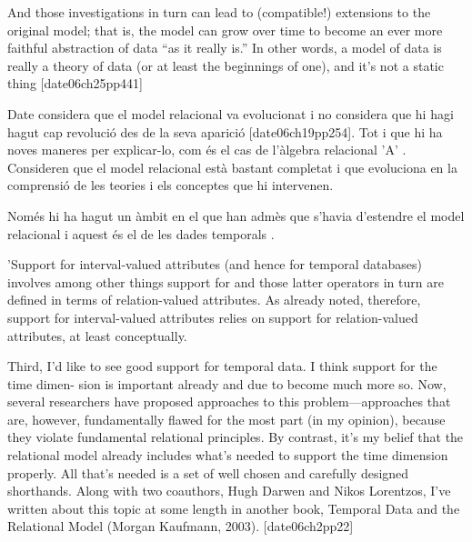                                 And those investigations in turn can lead to (compatible!)
extensions to the original model; that is, the model can grow over time to become an
ever more faithful abstraction of data “as it really is.” In other words, a model of data is
really a theory of data (or at least the beginnings of one), and it’s not a static thing [date06ch25pp441]



Date considera que el model relacional va evolucionat i no considera que hi hagi hagut cap revolució des de la seva aparició [date06ch19pp254]. Tot i que hi ha noves maneres per explicar-lo, com és el cas de l'àlgebra relacional 'A' . Consideren que el model relacional està bastant completat i que evoluciona en la comprensió de les teories i els conceptes que hi intervenen. 

Només hi ha hagut un àmbit en el que han admès que s'havia d'estendre el model relacional i aquest és el de les dades temporals .


  'Support for interval-valued attributes (and hence for temporal databases) involves among other things support for
and those latter operators in turn are defined in terms of relation-valued attributes. As already noted, therefore, support
for interval-valued attributes relies on support for relation-valued attributes, at least conceptually. 

Third, I’d like to see good support for temporal data. I think support for the time dimen-
sion is important already and due to become much more so. Now, several researchers
have proposed approaches to this problem—approaches that are, however, fundamentally
flawed for the most part (in my opinion), because they violate fundamental relational
principles. By contrast, it’s my belief that the relational model already includes what’s
needed to support the time dimension properly. All that’s needed is a set of well chosen
and carefully designed shorthands. Along with two coauthors, Hugh Darwen and Nikos
Lorentzos, I’ve written about this topic at some length in another book, Temporal Data
and the Relational Model (Morgan Kaufmann, 2003). [date06ch2pp22]





